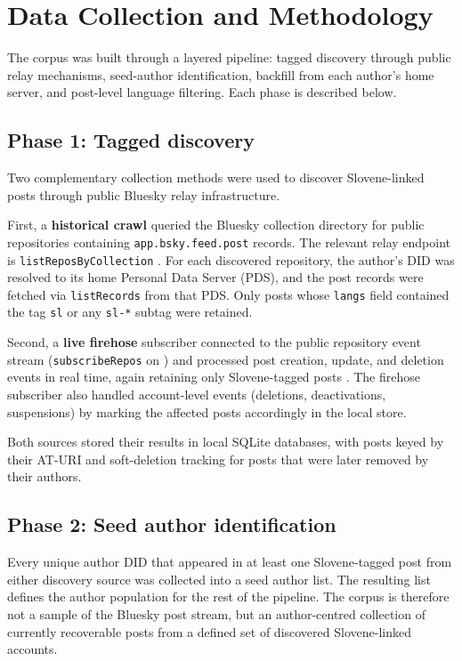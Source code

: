 \section{Data Collection and Methodology}
\label{sec:corpus-construction}

The corpus was built through a layered pipeline: tagged discovery through public relay mechanisms, seed-author identification, backfill from each author's home server, and post-level language filtering. Each phase is described below.

\subsection{Phase 1: Tagged discovery}

Two complementary collection methods were used to discover Slovene-linked posts through public Bluesky relay infrastructure.

First, a \textbf{historical crawl} queried the Bluesky collection directory for public repositories containing \texttt{app.bsky.feed.post} records. The relevant relay endpoint is \texttt{listReposByCollection} \parencite{atproto-sync,bsky-listreposbycollection}. For each discovered repository, the author's DID was resolved to its home Personal Data Server (PDS), and the post records were fetched via \texttt{listRecords} from that PDS. Only posts whose \texttt{langs} field contained the tag \texttt{sl} or any \texttt{sl-*} subtag were retained.

Second, a \textbf{live firehose} subscriber connected to the public repository event stream (\texttt{subscribeRepos} on ) and processed post creation, update, and deletion events in real time, again retaining only Slovene-tagged posts \parencite{atproto-streaming}. The firehose subscriber also handled account-level events (deletions, deactivations, suspensions) by marking the affected posts accordingly in the local store.

Both sources stored their results in local SQLite databases, with posts keyed by their AT-URI and soft-deletion tracking for posts that were later removed by their authors.

\subsection{Phase 2: Seed author identification}

Every unique author DID that appeared in at least one Slovene-tagged post from either discovery source was collected into a seed author list. The resulting list defines the author population for the rest of the pipeline. The corpus is therefore not a sample of the Bluesky post stream, but an author-centred collection of currently recoverable posts from a defined set of discovered Slovene-linked accounts.

